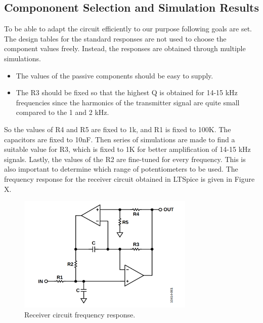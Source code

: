 \documentclass[letterpaper,12pt]{article}
\begin{document}
\subsection{Compononent Selection and Simulation Results}
To be able to adapt the circuit efficiently to our purpose following goals are set. The design tables for the standard responses are not used to choose the component values freely. Instead, the responses are obtained through multiple simulations.
\begin{itemize}
    \item The values of the passive components should be easy to supply.
    \item The R3 should be fixed so that the highest Q is obtained for 14-15 kHz frequencies since the harmonics of the transmitter signal are quite small compared to the 1 and 2 kHz.
\end{itemize}
So the values of R4 and R5 are fixed to 1k, and R1 is fixed to 100K. The capacitors are fixed to 10nF. Then series of simulations are made to find a suitable value for R3, which is fixed to 1K for better amplification of 14-15 kHz signals. Lastly, the values of the R2 are fine-tuned for every frequency. This is also important to determine which range of potentiometers to be used. The frequency response for the receiver circuit obtained in LTSpice is given in Figure X.
\begin{figure}[H]
    \centering
    \includegraphics[width = 0.75\textwidth]{dualopamp.png}
    \caption{Receiver circuit frequency response.}
\end{figure}
\end{document}
